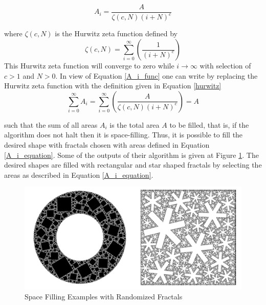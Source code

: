 	\begin{equation} \label{A_i_func}
	A_i = {\frac{A}{{\zeta(c,N)(i+N)^c}}}
	\end{equation}	
	
	where ${\zeta(c,N)}$ is the Hurwitz zeta function defined by 
	\begin{equation} \label{hurwitz}
	\zeta(c,N) = \sum_{i=0}^{\infty}\left(\frac{1}{(i+N)^c}\right)
	\end{equation}
	This Hurwitz zeta function will converge to zero while $i\to\infty$  with selection of $c>1$ and $N>0$. In view of Equation \ref{A_i_func} one can write by replacing the Hurwitz zeta function with the definition given in Equation \ref{hurwitz}
	\begin{equation} \label{A_i_equation}
	\sum_{i=0}^{\infty}A_i = \sum_{i = 0}^{\infty}\left(\frac{A}{\zeta(c,N)(i+N)^c}\right) = A
	\end{equation}


such that the sum of all areas $A_i$ is the total area $A$ to be filled, that is, if the algorithm does not halt then it is space-filling. Thus, it is possible to fill the desired shape with fractals chosen with areas defined in Equation \ref{A_i_equation}. Some of the outputs of their algorithm is given at Figure \ref{space_filling}. The desired shapes are filled with rectangular and star shaped fractals by selecting the areas as described in Equation \ref{A_i_equation}.



\begin{figure}[H]
	\caption{Space Filling Examples with Randomized Fractals \cite{26}} \label{space_filling}
	\centering
	\includegraphics[scale = 1]{randomized1}
\end{figure}


